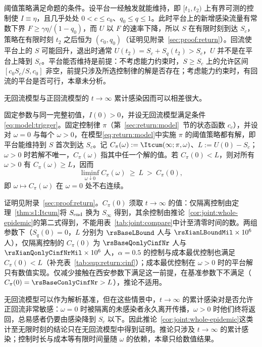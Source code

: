 阈值策略满足命题的条件。设平台一经触发就能维持，即 $[t_1,t_2)$ 上有界可测的控制使 $I\equiv\eta$，且几乎处处 $0<c\le c_0$、$q_0\le q\le1$。此时平台上的新增感染流量有常数下界 $F\ge\gamma\eta/(1-q_0)$，而 $U$ 以 $F$ 的速率下降，所以 $S$ 在有限时刻到达 $S_c$，策略在有限时刻 $t_2$ 之后恒为 $(c_0,q_0)$（证明见附录~\ref{sec:proof:return}）。回流使平台上的 $S$ 可能回升，退出时通常 $U(t_2)=S_c+S_q(t_2)>S_c$，$U$ 并不是在平台上降到 $S_c$。平台能否维持是前提：不考虑能力约束时，$S\ge S_c$ 上的允许区间 $[c_0S_c/S,c_0]$ 非空，前提只涉及所选控制律的解是否存在；考虑能力约束时，有回流的平台是否可行，本章未分析。

无回流模型与正回流模型的 $t\to\infty$ 累计感染因而可以相差很大。
\begin{corollaryn}
\label{cor:return:right-discontinuity}
固定参数与同一完整初值，$I(0)>0$，并设无回流模型满足条件\eqref{eq:model:trigger}。固定控制律 $\pi$（第~\ref{sec:return:model}~节的状态函数 $c_c$），并设对 $\omega=0$ 与每个 $\omega>0$，在模型\eqref{eq:return:model}中实施 $\pi$ 的阈值策略都有解，即平台能维持到 $S$ 首次到达 $S_c$。记 $C_\pi(\omega):=\Itcum(\infty;\pi,\omega)$、$L:=U(0)-S_c$；$\omega>0$ 时若解不唯一，$C_\pi(\omega)$ 指其中任一个解的值。若 $C_\pi(0)<L$，则对所有 $\omega>0$ 有 $C_\pi(\omega)\ge L$，因而
\begin{equation}
\liminf_{\omega\downarrow0}C_\pi(\omega)\ \ge\ L\ >\ C_\pi(0),
\label{eq:return:discontinuity}
\end{equation}
即 $\omega\mapsto C_\pi(\omega)$ 在 $\omega=0$ 处不右连续。
\end{corollaryn}
证明见附录~\ref{sec:proof:return}。$C_\pi(0)$ 须取 $t\to\infty$ 的值：仅隔离控制由定理~\ref{thm:s1:Itcum}将 $S_{\rm end}$ 换为 $S_\infty$ 得到，其余控制由推论~\ref{cor:joint:whole-epidemic}的第二式得到，不能用表~\ref{tab:joint:compare}中计至清零时间的数。两组参数下（$S_q(0)=0$，$L$ 分别为 $\rsBaseLBound$ 人与 $\rsXianLBoundMil\times10^{6}$ 人），仅隔离控制的 $C_\pi(0)$ 为 $\rsBaseQonlyCinfNr$ 人与 $\rsXianQonlyCinfNrMil\times10^{6}$ 人，$\alpha=0.5$ 的控制与成本最优控制也满足 $C_\pi(0)<L$（补充表~\ref*{tab:sup:return:cinf}）；成本最优控制在 $\omega>0$ 时的平台解只有数值实现。仅减少接触在西安参数下满足这一前提，在基准参数下不满足（$C_\pi(0)=\rsBaseConlyCinfNr>L$），推论不适用。

无回流模型可以作为解析基准，但在这些情景中，$t\to\infty$ 的累计感染对是否允许正回流非常敏感：$\omega=0$ 时被隔离的未感染者永久离开传播，$\omega>0$ 时他们终将返回，总易感者仍要由感染降到 $S_c$ 以下。因此推论~\ref{cor:joint:whole-epidemic}这类计至无限时刻的结论只在无回流模型中得到证明。推论只涉及 $t\to\infty$ 的累计感染；控制时长与成本等有限时间量随 $\omega$ 的依赖，本章只给数值结果。

